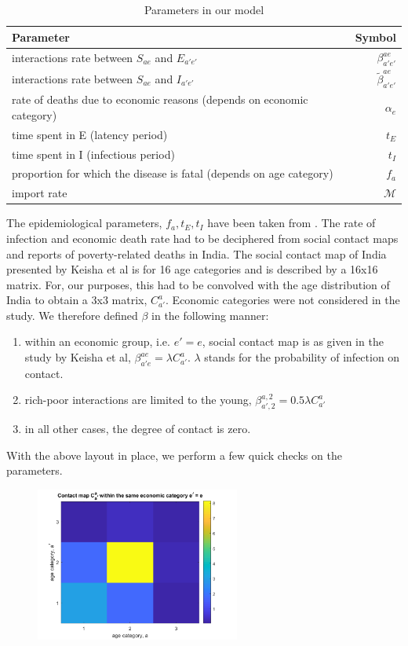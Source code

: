 \documentclass{article}
\begin{document}
\begin{table}[H]
	\centering
	\begin{tabular}{l r} %
		\toprule
		\textbf{Parameter} & \textbf{Symbol} \\ %
		\midrule
		interactions rate between $S_{ae}$ and $E_{a'e'}$ & $\beta^{ae}_{a'e'}$ \\ 
		interactions rate between $S_{ae}$ and $I_{a'e'}$ & $\tilde{\beta}^{ae}_{a'e'}$ \\ 
		rate of deaths due to economic reasons (depends on economic category)  & $\alpha_e$ \\
		time spent in E (latency period) & $t_E$ \\ 
		time spent in I (infectious period) & $t_I$ \\
		proportion for which the disease is fatal (depends on age category) & $f_a$ \\
		import rate & $\mathcal{M}$ \\
		\bottomrule
	\end{tabular}
	\caption{Parameters in our model}
	\label{table:our_model_parameters}
\end{table}
The epidemiological parameters, $f_a, t_E, t_I$ have been taken from \cite{NeherFeb2020}. The rate of infection and economic death rate had to be deciphered from social contact maps \cite{Keisha2017} and reports of poverty-related deaths in India.
The social contact map of India presented by Keisha et al is for 16 age categories and is described by a 16x16 matrix. For, our purposes, this had to be convolved with the age distribution of India to obtain a 3x3 matrix, $ C_{a'}^a$. Economic categories were not considered in the study. We therefore defined $\beta$ in the following manner:
\begin{enumerate}
	\item within an economic group, i.e. $e' = e$, social contact map is as given in the study by Keisha et al, $\beta^{ae}_{a'e} = \lambda C_{a'}^a$. $\lambda$ stands for the probability of infection on contact.
	\item rich-poor interactions are limited to the young, $\beta^{a,2}_{a',2} = 0.5 \lambda C_{a'}^a$
	\item in all other cases, the degree of contact is zero.
\end{enumerate}

With the above layout in place, we perform a few quick checks on the parameters. 
\begin{figure}[H]
	\centering
	\includegraphics[width=0.6\textwidth]{ContactMap}
\end{figure}
\end{document}
